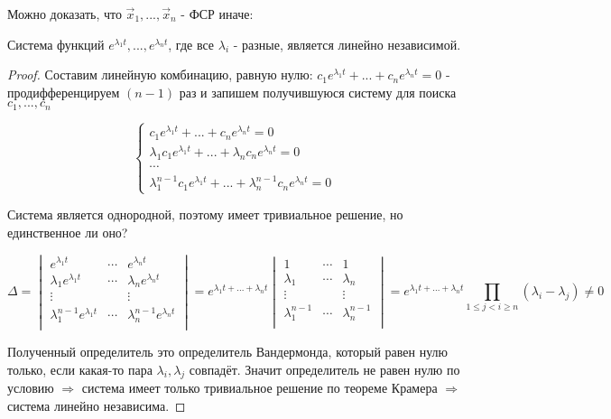 Можно доказать, что $\vec{x}_1, ..., \vec{x}_n$ - ФСР иначе:
\begin{lemma}
  Система функций $e^{\lambda_1t}, ..., e^{\lambda_n t}$, где все $\lambda_i$ - разные, является линейно независимой.  
\end{lemma}
\begin{proof}
  Составим линейную комбинацию, равную нулю: $c_1 e^{\lambda_1 t} + ... + c_n e^{\lambda_n t} = 0$ - продифференцируем $(n-1)$ раз и 
  запишем получившуюся систему для поиска $c_1, ..., c_n$

  \[
  \begin{cases}
    c_1 e^{\lambda_1 t} + ... + c_n e^{\lambda_n t} = 0 \\
    \lambda_1 c_1 e^{\lambda_1 t} + ... + \lambda_n c_n e^{\lambda_n t} = 0 \\
    \cdots \\
    \lambda_1^{n-1} c_1 e^{\lambda_1 t} + ... + \lambda_n^{n-1} c_n e^{\lambda_n t} = 0
  \end{cases} 
  \]

Система является однородной, поэтому имеет тривиальное решение, но единственное ли оно? 

\[ \Delta = \begin{vmatrix*}
  e^{\lambda_1 t} & \cdots & e^{\lambda_n t} \\
  \lambda_1 e^{\lambda_1 t} & \cdots & \lambda_n e^{\lambda_n t} \\
  \vdots &  & \vdots \\ 
  \lambda_1^{n-1} e^{\lambda_1 t} & \cdots & \lambda_n^{n-1} e^{\lambda_n t} \\
\end{vmatrix*} = e^{\lambda_1 t + ... + \lambda_n t} \begin{vmatrix*}
  1 & \cdots & 1 \\
  \lambda_1  & \cdots & \lambda_n  \\
  \vdots &  & \vdots \\ 
  \lambda_1^{n-1}  & \cdots & \lambda_n^{n-1} \\
\end{vmatrix*} = e^{\lambda_1 t + ... + \lambda_n t} \prod \limits_{1 \leq j < i \geq n} (\lambda_i - \lambda_j) \neq 0
\]

Полученный определитель это определитель Вандермонда, который равен нулю только, если какая-то пара $\lambda_i, \lambda_j$ совпадёт. 
Значит определитель не равен нулю по условию $\Rightarrow$ система имеет только тривиальное решение по теореме Крамера $\Rightarrow$ система линейно независима.
\end{proof}

